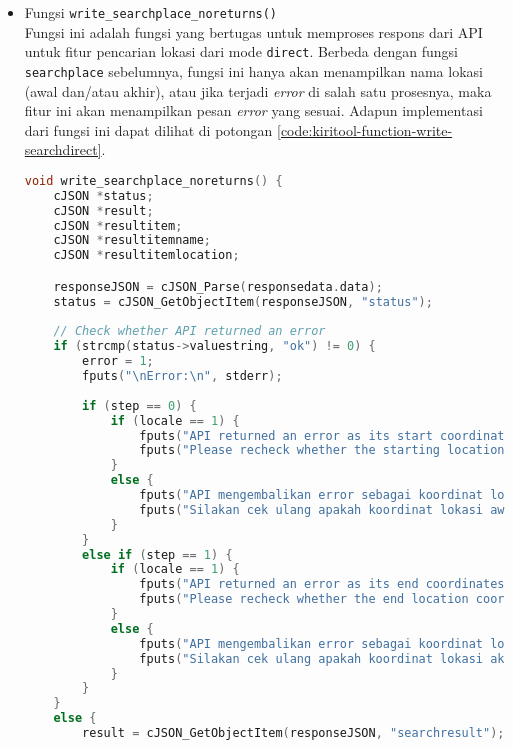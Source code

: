 \begin{itemize}[listparindent=\parindent]
\begin{lstlisting}[language=C, caption=Implementasi fungsi write\textunderscore findroute(), label=code:kiritool-function-write-findroute]
            indexroute++;
        }
    }
}
	\end{lstlisting}
	
	\item Fungsi \verb|write_searchplace_noreturns()| \\
	Fungsi ini adalah fungsi yang bertugas untuk memproses respons dari API untuk fitur pencarian lokasi dari mode \verb|direct|. Berbeda dengan fungsi \verb|searchplace| sebelumnya, fungsi ini hanya akan menampilkan nama lokasi (awal dan/atau akhir), atau jika terjadi \textit{error} di salah satu prosesnya, maka fitur ini akan menampilkan pesan \textit{error} yang sesuai. Adapun implementasi dari fungsi ini dapat dilihat di potongan \ref{code:kiritool-function-write-searchdirect}.
	
	\begin{lstlisting}[language=C, caption=Implementasi fungsi write\textunderscore searchplace\textunderscore noreturns(), label=code:kiritool-function-write-searchdirect]
void write_searchplace_noreturns() {
    cJSON *status;
    cJSON *result;
    cJSON *resultitem;
    cJSON *resultitemname;
    cJSON *resultitemlocation;

    responseJSON = cJSON_Parse(responsedata.data);
    status = cJSON_GetObjectItem(responseJSON, "status");
    
    // Check whether API returned an error
    if (strcmp(status->valuestring, "ok") != 0) {
        error = 1;
        fputs("\nError:\n", stderr);
        
        if (step == 0) {
            if (locale == 1) {
                fputs("API returned an error as its start coordinates.\n", stderr);
                fputs("Please recheck whether the starting location coordinates were inputted correctly.\n", stderr);
            }
            else {
                fputs("API mengembalikan error sebagai koordinat lokasi awal.\n", stderr);
                fputs("Silakan cek ulang apakah koordinat lokasi awal sudah dimasukkan dengan benar.\n", stderr);
            }
        }
        else if (step == 1) {
            if (locale == 1) {
                fputs("API returned an error as its end coordinates.\n", stderr);
                fputs("Please recheck whether the end location coordinates were inputted correctly.\n", stderr);
            }
            else {
                fputs("API mengembalikan error sebagai koordinat lokasi akhir.\n", stderr);
                fputs("Silakan cek ulang apakah koordinat lokasi akhir sudah dimasukkan dengan benar.\n", stderr);
            }
        }
    }
    else {
        result = cJSON_GetObjectItem(responseJSON, "searchresult");


\end{lstlisting}
\end{itemize}
